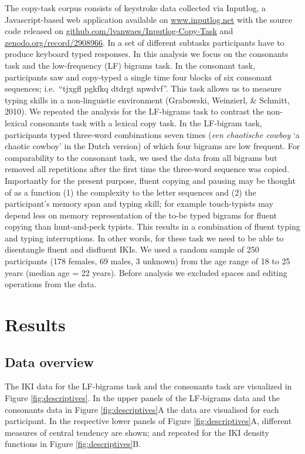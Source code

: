 \documentclass[
  english,
  man,mask,floatsintext]{apa7}
\begin{document}
The copy-task corpus consists of keystroke data collected via Inputlog, a Javascript-based web application available on \url{www.inputlog.net} with the source code released on \href{https://github.com/lvanwaes/Inputlog-Copy-Task}{github.com/lvanwaes/Inputlog-Copy-Task} and \href{https://zenodo.org/record/2908966}{zenodo.org/record/2908966}. In a set of different subtasks participants have to produce keyboard typed responses. In this analysis we focus on the consonants task and the low-frequency (LF) bigrams task. In the consonant task, participants saw and copy-typed a single time four blocks of six consonant sequences; i.e.~``tjxgfl pgkfkq dtdrgt npwdvf''. This task allows us to measure typing skills in a non-linguistic environment (Grabowski, Weinzierl, \& Schmitt, 2010). We repeated the analysis for the LF-bigrams task to contrast the non-lexical consonants task with a lexical copy task. In the LF-bigram task, participants typed three-word combinations seven times (\emph{een chaotische cowboy} `a chaotic cowboy' in the Dutch version) of which four bigrams are low frequent. For comparability to the consonant task, we used the data from all bigrams but removed all repetitions after the first time the three-word sequence was copied. Importantly for the present purpose, fluent copying and pausing may be thought of as a function (1) the complexity to the letter sequences and (2) the participant's memory span and typing skill; for example touch-typists may depend less on memory representation of the to-be typed bigrams for fluent copying than hunt-and-peck typists. This results in a combination of fluent typing and typing interruptions. In other words, for these task we need to be able to disentangle fluent and disfluent IKIs. We used a random sample of 250 participants (178 females, 69 males, 3 unknown) from the age range of 18 to 25 years (median age = 22 years). Before analysis we excluded spaces and editing operations from the data.

\hypertarget{results}{%
\section{Results}\label{results}}

\hypertarget{data-overview}{%
\subsection{Data overview}\label{data-overview}}

The IKI data for the LF-bigrams task and the consonants task are visualized in Figure \ref{fig:descriptives}. In the upper panels of the LF-bigrams data and the consonants data in Figure \ref{fig:descriptives}A the data are visualised for each participant. In the respective lower panels of Figure \ref{fig:descriptives}A, different measures of central tendency are shown; and repeated for the IKI density functions in Figure \ref{fig:descriptives}B.
\end{document}

